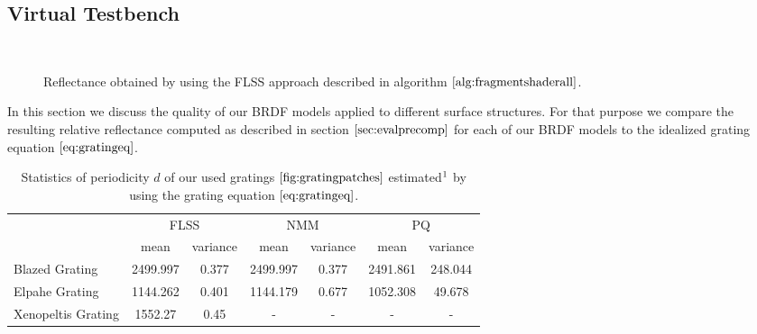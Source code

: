\subsection{Virtual Testbench}
\label{sec:virtualtestbench}
\begin{figure}[H]
  \centering
~
  

\caption[Validation of FLSS Approach applied on our Gratings]{Reflectance obtained by using the FLSS approach described in algorithm $\ref{alg:fragmentshaderall}$.}
\label{fig:evaluationdiffshaderalllambda}
\end{figure}

In this section we discuss the quality of our BRDF models applied to different surface structures. For that purpose we compare the resulting relative reflectance computed as described in section $\ref{sec:evalprecomp}$ for each of our BRDF models to the idealized grating equation $\ref{eq:gratingeq}$. 

\begin{table}[H]
\centering
\begin{tabular}{l|c|c|c|c|c|c|}
\cline{2-7}
                                         & \multicolumn{2}{c|}{FLSS} & \multicolumn{2}{c|}{NMM} & \multicolumn{2}{c|}{PQ} \\ \cline{2-7} 
                                         & mean        & variance    & mean        & variance   & mean       & variance   \\ \hline
\multicolumn{1}{|l|}{Blazed Grating}     & 2499.997    & 0.377       & 2499.997    & 0.377      & 2491.861   & 248.044    \\ \hline
\multicolumn{1}{|l|}{Elpahe Grating}     & 1144.262    & 0.401       & 1144.179    & 0.677      & 1052.308   & 49.678     \\ \hline
\multicolumn{1}{|l|}{Xenopeltis Grating} & 1552.27     & 0.45        & -           & -          & -          & -          \\ \hline
\end{tabular}
\caption[Estimated Grating Spacings]{Statistics of periodicity $d$ of our used gratings $\ref{fig:gratingpatches}$ estimated$\footnotemark$ by using the grating equation $\ref{eq:gratingeq}$.}
\label{tab:gratingsmeanvariance}
\end{table}

